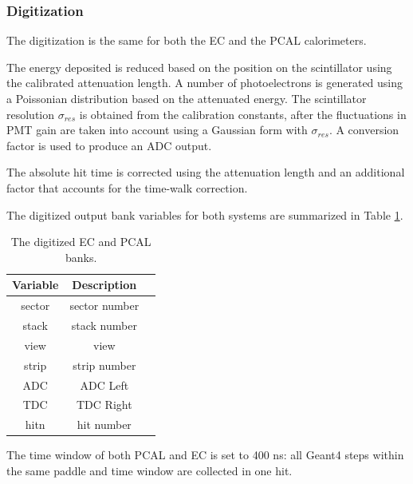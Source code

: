 \subsubsection{Digitization}
The digitization is the same for both the EC and the PCAL calorimeters.

The energy deposited is reduced based on the position on the scintillator using the calibrated attenuation length.
A number of photoelectrons is generated using a Poissonian distribution based on the attenuated energy.
The scintillator resolution $\sigma_{res}$ is obtained from the calibration constants, after the fluctuations in PMT gain
are taken into account using a Gaussian form with $\sigma_{res}$. A conversion factor is used to produce an ADC output.

The absolute hit time is corrected using the attenuation length and an additional factor that accounts for the time-walk correction.

The digitized output bank variables for both systems are summarized in Table \ref{tab:ecBank}.

\begin{table}[h]
	\begin{center}
		\begin{tabular}{| c | c | c |}
			\hline \hline
			Variable & Description                                         \\
			\hline
             sector  &                                     sector number   \\
              stack  &                                      stack number   \\
               view  &                                              view   \\
              strip  &                                      strip number   \\
                ADC  &                                          ADC Left   \\
                TDC  &                                         TDC Right   \\
               hitn  &                                        hit number   \\
			\hline \hline
		\end{tabular}
	\end{center}
	\caption{The digitized EC and PCAL banks.}\label{tab:ecBank}
\end{table}


The time window of both PCAL and EC is set to 400 ns: all Geant4 steps within the same paddle and time window are collected in one hit.
